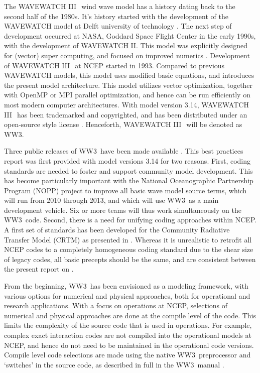 \documentclass[12pt]{article}
\newcommand{\ww}{WAVEWATCH III$\:$\texttrademark}
\newcommand{\ws}{WW3}
\begin{document}
\noindent
The \ww\ wind wave model has a history dating back to the second half of the
1980s. It's history started with the development of the WAVEWATCH model at
Delft university of technology \citep{tol:CHGE89, tol:CHGE90, tol:JPO91b}. The
next step of development occurred at NASA, Goddard Space Flight Center in the
early 1990s, with the development of WAVEWATCH II. This model was explicitly
designed for (vector) super computing, and focused on improved numerics
\citep{tol:JPO92, tol:ICCE92}. Development of \ww\ at NCEP started in 1993.
Compared to previous WAVEWATCH models, this model uses modified basic
equations, and introduces the present model architecture. This model utilizes
vector optimization, together with OpenMP or MPI parallel optimization, and
hence can be run efficiently on most modern computer architectures.  With
model version 3.14, \ww\ has been trademarked and copyrighted, and has been
distributed under an open-source style license \citep[see section 1.2 of ][or
the web
site\footnote{~http://polar.ncep.noaa.gov/waves/wavewatch/license.shtml
}]{tol:MMAB09a}. Henceforth, \ww\ will be denoted as \ws.

Three public releases of \ws\ have been made available
\citep{tol:OMB99a,tol:OMB02b, tol:MMAB09a}. This best practices report was
first provided with model versions 3.14 for two reasons. First, coding
standards are needed to foster and support community model development. This
has become particularly important with the National Oceanographic Partnership
Program (NOPP) project to improve all basic wave model source terms, which
will run from 2010 through 2013, and which will use \ws\ as a main development
vehicle. Six or more teams will thus work simultaneously on the \ws\
code. Second, there is a need for unifying coding approaches within NCEP. A
first set of standards has been developed for the Community Radiative Transfer
Model (CRTM) as presented in \cite{rep:PvD08}. Whereas it is unrealistic to
retrofit all NCEP codes to a completely homogeneous coding standard due to the
shear size of legacy codes, all basic precepts should be the same, and are
consistent between the present report on \cite{rep:PvD08}.

From the beginning, \ws\ has been envisioned as a modeling framework, with
various options for numerical and physical approaches, both for operational
and research applications. With a focus on operations at NCEP, selections of
numerical and physical approaches are done at the compile level of the
code. This limits the complexity of the source code that is used in
operations. For example, complex exact interaction codes are not compiled into
the operational models at NCEP, and hence do not need to be maintained in the
operational code versions. Compile level code selections are made using the
native \ws\ preprocessor and `switches' in the source code, as described in
full in the \ws\ manual \cite[or more recent versions]{tol:MMAB09a}.
\end{document}
